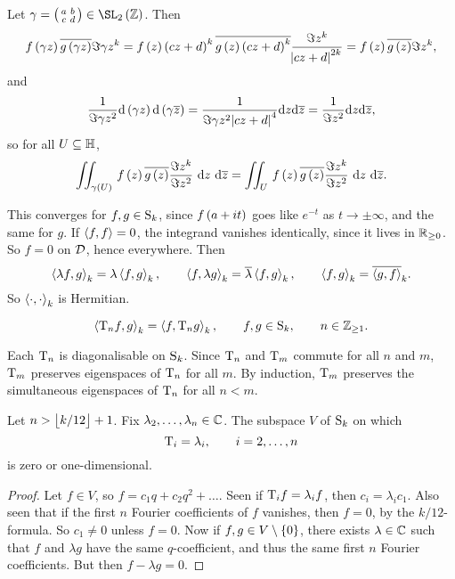 Let $ \gamma = \twobytwosmall{a}{b}{c}{d} \in \SL_2\br{\ZZ} $. Then
$$ f\br{\gamma z}\overline{g\br{\gamma z}}\Im \gamma z^k = f\br{z}\br{cz + d}^k\overline{g\br{z}\br{cz + d}^k}\dfrac{\Im z^k}{\abs{cz + d}^{2k}} = f\br{z}\overline{g\br{z}}\Im z^k, $$
and
$$ \dfrac{1}{\Im \gamma z^2}\d\br{\gamma z}\d\br{\gamma \overline{z}} = \dfrac{1}{\Im \gamma z^2\abs{cz + d}^4}\d z\d\overline{z} = \dfrac{1}{\Im z^2}\d z\d\overline{z}, $$
so for all $ U \subseteq \HH $,
$$ \iintd{\gamma\br{U}}{f\br{z}\overline{g\br{z}}\dfrac{\Im z^k}{\Im z^2}}{z}{\overline{z}} = \iintd{U}{f\br{z}\overline{g\br{z}}\dfrac{\Im z^k}{\Im z^2}}{z}{\overline{z}}. $$

\begin{note*}
This converges for $ f, g \in \S_k $, since $ f\br{a + it} $ goes like $ e^{-t} $ as $ t \to \pm\infty $, and the same for $ g $. If $ \abr{f, f} = 0 $, the integrand vanishes identically, since it lives in $ \RR_{\ge 0} $. So $ f = 0 $ on $ \DDD $, hence everywhere. Then
$$ \abr{\lambda f, g}_k = \lambda\abr{f, g}_k, \qquad \abr{f, \lambda g}_k = \overline{\lambda}\abr{f, g}_k, \qquad \abr{f, g}_k = \overline{\abr{g, f}}_k. $$
So $ \abr{\cdot, \cdot}_k $ is Hermitian.
\end{note*}

\begin{theorem}
\label{thm:innerproduct}
$$ \abr{\T_nf, g}_k = \abr{f, \T_ng}_k, \qquad f, g \in \S_k, \qquad n \in \ZZ_{\ge 1}. $$
\end{theorem}

\begin{corollary}
Each $ \T_n $ is diagonalisable on $ \S_k $. Since $ \T_n $ and $ \T_m $ commute for all $ n $ and $ m $, $ \T_m $ preserves eigenspaces of $ \T_n $ for all $ m $. By induction, $ \T_m $ preserves the simultaneous eigenspaces of $ \T_n $ for all $ n < m $.
\end{corollary}

\begin{proposition}
Let $ n > \fbr{k / 12} + 1 $. Fix $ \lambda_2, \dots, \lambda_n \in \CC $. The subspace $ V $ of $ \S_k $ on which
$$ \T_i = \lambda_i, \qquad i = 2, \dots, n $$
is zero or one-dimensional.
\end{proposition}

\begin{proof}
Let $ f \in V $, so $ f = c_1q + c_2q^2 + \dots $. Seen if $ \T_if = \lambda_if $, then $ c_i = \lambda_ic_1 $. Also seen that if the first $ n $ Fourier coefficients of $ f $ vanishes, then $ f = 0 $, by the $ k / 12 $-formula. So $ c_1 \ne 0 $ unless $ f = 0 $. Now if $ f, g \in V \setminus \cbr{0} $, there exists $ \lambda \in \CC $ such that $ f $ and $ \lambda g $ have the same $ q $-coefficient, and thus the same first $ n $ Fourier coefficients. But then $ f - \lambda g = 0 $.
\end{proof}

